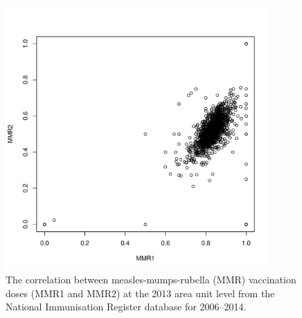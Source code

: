 \documentclass{article}
\begin{document}
\begin{figure}[H]
     \begin{center}
     \includegraphics[width=0.9\textwidth]{nir_census_MMR1_NIR_cor.pdf}
     \end{center}
     \caption{The correlation between measles-mumps-rubella (MMR) vaccination doses (MMR1 and MMR2) at the 2013 area unit level from the National Immunisation Register database for 2006--2014.}
     \label{fig:cor_nir}
\end{figure}
\end{document}
